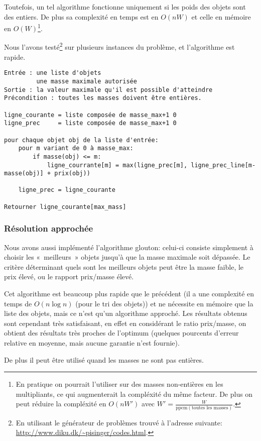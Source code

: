     Toutefois, un tel algorithme fonctionne uniquement si les poids des objets
    sont des entiers. De plus sa complexité en temps est en $O(nW)$ et celle en
    mémoire en $O(W)$\footnote{En pratique on pourrait l'utiliser sur des
    masses non-entières en les multipliants, ce qui augmenterait la compléxité
    du même facteur. De plus on peut réduire la compléxité en $O(nW')$ avec
    $W' = \frac W {\mathrm{ppcm}(\text{toutes les masses})}$.}.

    Nous l'avons testé\footnote{En utilisant le générateur de problèmes trouvé
    à l'adresse suivante: \url{http://www.diku.dk/~pisinger/codes.html}.} sur
    plusieurs instances du problème, et l'algorithme est rapide.

    \begin{lstlisting}
Entrée : une liste d'objets
         une masse maximale autorisée
Sortie : la valeur maximale qu'il est possible d'atteindre
Précondition : toutes les masses doivent être entières.

ligne_courante = liste composée de masse_max+1 0
ligne_prec     = liste composée de masse_max+1 0

pour chaque objet obj de la liste d'entrée:
    pour m variant de 0 à masse_max:
        if masse(obj) <= m:
            ligne_courrante[m] = max(ligne_prec[m], ligne_prec_line[m-masse(obj)] + prix(obj))

    ligne_prec = ligne_courante

Retourner ligne_courante[max_mass]
    \end{lstlisting}

  \subsubsection{Résolution approchée}
    Nous avons aussi implémenté l'algorithme glouton: celui-ci consiste
    simplement à choisir les «~meilleurs~» objets jusqu'à que la masse maximale
    soit dépassée. Le critère déterminant quels sont les meilleurs objets peut
    être la masse faible, le prix élevé, ou le rapport prix/masse élevé.

    Cet algorithme est beaucoup plus rapide que le précédent (il a une
    complexité en temps de $O(n \log n)$ (pour le tri des objets)) et ne
    nécessite en mémoire que la liste des objets, mais ce n'est qu'un algorithme
    approché. Les résultats obtenus sont cependant très satisfaisant, en effet
    en considérant le ratio \nobreak prix/masse, on obtient des résultats très
    proches de l'optimum (quelques pourcents d'erreur relative en moyenne, mais
    aucune garantie n'est fournie).

    De plus il peut être utilisé quand les masses ne sont pas entières.

